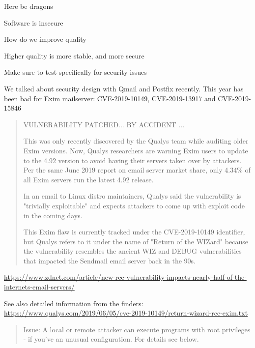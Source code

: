 \documentclass[Screen16to9,17pt]{foils}
\begin{document}


Here be dragons
\begin{list2}
\item Software is insecure
\item How do we improve quality
\item Higher quality is more stable, and more secure
\item Make sure to test specifically for security issues
\end{list2}

We talked about security design with Qmail and Postfix recently. This year has been bad for Exim mailserver: CVE-2019-10149, CVE-2019-13917 and CVE-2019-15846


\begin{quote}
  VULNERABILITY PATCHED... BY ACCIDENT
...

This was only recently discovered by the Qualys team while auditing older Exim versions. Now, Qualys researchers are warning Exim users to update to the 4.92 version to avoid having their servers taken over by attackers. Per the same June 2019 report on email server market share, only 4.34\% of all Exim servers run the latest 4.92 release.

In an email to Linux distro maintainers, Qualys said the vulnerability is "trivially exploitable" and expects attackers to come up with exploit code in the coming days.

This Exim flaw is currently tracked under the CVE-2019-10149 identifier, but Qualys refers to it under the name of "Return of the WIZard" because the vulnerability resembles the ancient WIZ and DEBUG vulnerabilities that impacted the Sendmail email server back in the 90s.
\end{quote}

{\footnotesize\url{https://www.zdnet.com/article/new-rce-vulnerability-impacts-nearly-half-of-the-internets-email-servers/}}

See also detailed information from the finders:\\ \url{https://www.qualys.com/2019/06/05/cve-2019-10149/return-wizard-rce-exim.txt}



\begin{quote}
Issue:      A local or remote attacker can execute programs with root
            privileges - if you've an unusual configuration. For details
	    see below.
\end{quote}
\end{document}
